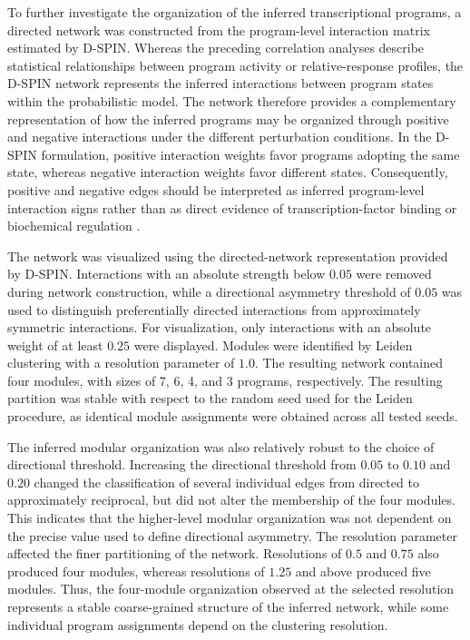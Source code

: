 \documentclass[11pt,a4paper]{article}
\begin{document}
To further investigate the organization of the inferred transcriptional programs, a directed network was constructed from the program-level interaction matrix estimated by D-SPIN. Whereas the preceding correlation analyses describe statistical relationships between program activity or relative-response profiles, the D-SPIN network represents the inferred interactions between program states within the probabilistic model. The network therefore provides a complementary representation of how the inferred programs may be organized through positive and negative interactions under the different perturbation conditions. In the D-SPIN formulation, positive interaction weights favor programs adopting the same state, whereas negative interaction weights favor different states. Consequently, positive and negative edges should be interpreted as inferred program-level interaction signs rather than as direct evidence of transcription-factor binding or biochemical regulation \cite{Jiang2023}.

The network was visualized using the directed-network representation provided by D-SPIN. Interactions with an absolute strength below $0.05$ were removed during network construction, while a directional asymmetry threshold of $0.05$ was used to distinguish preferentially directed interactions from approximately symmetric interactions. For visualization, only interactions with an absolute weight of at least $0.25$ were displayed. Modules were identified by Leiden clustering with a resolution parameter of $1.0$. The resulting network contained four modules, with sizes of 7, 6, 4, and 3 programs, respectively. The resulting partition was stable with respect to the random seed used for the Leiden procedure, as identical module assignments were obtained across all tested seeds.

The inferred modular organization was also relatively robust to the choice of directional threshold. Increasing the directional threshold from $0.05$ to $0.10$ and $0.20$ changed the classification of several individual edges from directed to approximately reciprocal, but did not alter the membership of the four modules. This indicates that the higher-level modular organization was not dependent on the precise value used to define directional asymmetry. The resolution parameter affected the finer partitioning of the network. Resolutions of $0.5$ and $0.75$ also produced four modules, whereas resolutions of $1.25$ and above produced five modules. Thus, the four-module organization observed at the selected resolution represents a stable coarse-grained structure of the inferred network, while some individual program assignments depend on the clustering resolution.
\end{document}
